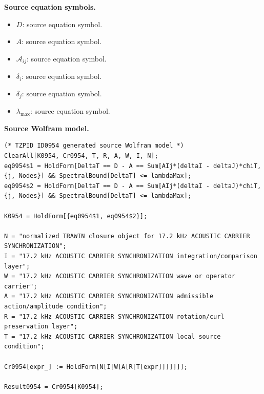 \begin{minipage}[t]{0.49\linewidth}
\begingroup
\small
\raggedright
\textbf{Source equation symbols.}\par
\begin{itemize}[leftmargin=1.35em,itemsep=1pt,topsep=1pt,parsep=0pt]
    \item $D$: source equation symbol.
    \item $A$: source equation symbol.
    \item $\mathcal{A}_{ij}$: source equation symbol.
    \item $\delta_i$: source equation symbol.
    \item $\delta_j$: source equation symbol.
    \item $\lambda_{\max}$: source equation symbol.
\end{itemize}
\endgroup
\end{minipage}\hfill
\begin{minipage}[t]{0.47\linewidth}
\begingroup
\scriptsize
\raggedright
\textbf{Source Wolfram model.}\par
\begin{Verbatim}[fontsize=\tiny,breaklines=true,breakanywhere=true]
(* TZPID ID0954 generated source Wolfram model *)
ClearAll[K0954, Cr0954, T, R, A, W, I, N];
eq0954$1 = HoldForm[DeltaT == D - A == Sum[AIj*(deltaI - deltaJ)*chiT, {j, Nodes}] && SpectralBound[DeltaT] <= lambdaMax];
eq0954$2 = HoldForm[DeltaT == D - A == Sum[AIj*(deltaI - deltaJ)*chiT, {j, Nodes}] && SpectralBound[DeltaT] <= lambdaMax];

K0954 = HoldForm[{eq0954$1, eq0954$2}];

N = "normalized TRAWIN closure object for 17.2 kHz ACOUSTIC CARRIER SYNCHRONIZATION";
I = "17.2 kHz ACOUSTIC CARRIER SYNCHRONIZATION integration/comparison layer";
W = "17.2 kHz ACOUSTIC CARRIER SYNCHRONIZATION wave or operator carrier";
A = "17.2 kHz ACOUSTIC CARRIER SYNCHRONIZATION admissible action/amplitude condition";
R = "17.2 kHz ACOUSTIC CARRIER SYNCHRONIZATION rotation/curl preservation layer";
T = "17.2 kHz ACOUSTIC CARRIER SYNCHRONIZATION local source condition";

Cr0954[expr_] := HoldForm[N[I[W[A[R[T[expr]]]]]]];

Result0954 = Cr0954[K0954];
\end{Verbatim}
\endgroup
\end{minipage}

